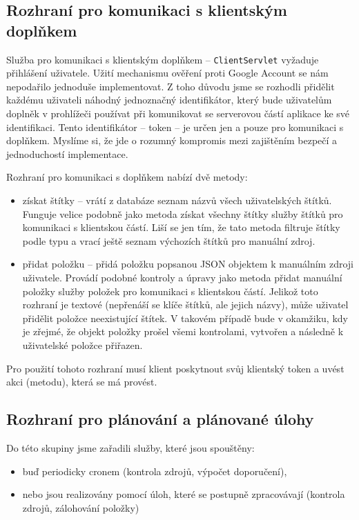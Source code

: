 \subsection{Rozhraní pro komunikaci s klientským doplňkem}

Služba pro komunikaci s klientským doplňkem -- \verb|ClientServlet| vyžaduje přihlášení uživatele.
Užití mechanismu ověření proti Google Account se nám nepodařilo jednoduše implementovat.
Z toho důvodu jsme se rozhodli přidělit každému uživateli náhodný jednoznačný identifikátor, který bude uživatelům doplněk v prohlížeči používat při komunikovat se serverovou částí aplikace ke své identifikaci.
Tento identifikátor -- token -- je určen jen a pouze pro komunikaci s doplňkem.
Myslíme si, že jde o rozumný kompromis mezi zajištěním bezpečí a jednoduchostí implementace.

Rozhraní pro komunikaci s doplňkem nabízí dvě metody:
\begin{itemize}
	\item získat štítky -- vrátí z databáze seznam názvů všech uživatelských štítků.
		Funguje velice podobně jako metoda získat všechny štítky služby štítků pro komunikaci s klientskou částí.
		Liší se jen tím, že tato metoda filtruje štítky podle typu a vrací ještě seznam výchozích štítků pro manuální zdroj.
	\item přidat položku -- přidá položku popsanou JSON objektem k manuálním zdroji uživatele.
		Provádí podobné kontroly a úpravy jako metoda přidat manuální položky služby položek pro komunikaci s klientskou částí.
		Jelikož toto rozhraní je textové (nepřenáší se klíče štítků, ale jejich názvy), může uživatel přidělit položce neexistující štítek.
		V takovém případě bude v okamžiku, kdy je zřejmé, že objekt položky prošel všemi kontrolami, vytvořen a následně k uživatelské položce přiřazen.
\end{itemize}

Pro použití tohoto rozhraní musí klient poskytnout svůj klientský token a uvést akci (metodu), která se má provést.

\subsection{Rozhraní pro plánování a plánované úlohy}

Do této skupiny jsme zařadili služby, které jsou spouštěny:
\begin{itemize}
	\item buď periodicky cronem (kontrola zdrojů, výpočet doporučení),
	\item nebo jsou realizovány pomocí úloh, které se postupně zpracovávají (kontrola zdrojů, zálohování položky)
\end{itemize}

